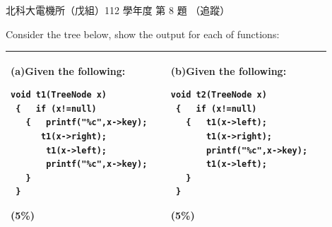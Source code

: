\begin{pastexam}[label={px:ntut-112-ee-ds-08}]{北科大電機所（戊組）112 學年度 第 8 題}
（追蹤）

Consider the tree below, show the output for each of functions:
\begin{center}
\end{center}
\noindent\begin{tabular}{|p{0.45\linewidth}|p{0.45\linewidth}|}
\hline
(a)Given the following:
\begin{verbatim}
void t1(TreeNode x)
 {   if (x!=null)
   {   printf("%c",x->key);
      t1(x->right);
       t1(x->left);
       printf("%c",x->key);
   }
 }
\end{verbatim}
\hfill (5\%)
&
(b)Given the following:
\begin{verbatim}
void t2(TreeNode x)
 {   if (x!=null)
   {   t1(x->left);
       t1(x->right);
       printf("%c",x->key);
       t1(x->left);
   }
 }
\end{verbatim}
\hfill (5\%)
\\ \hline
\end{tabular}
\end{pastexam}

